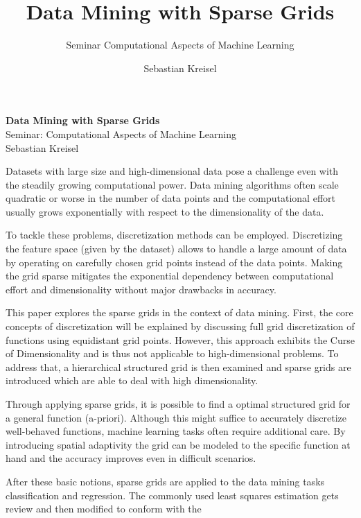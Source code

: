 \documentclass[a4paper]{scrartcl}
\title{Data Mining with Sparse Grids}
\subtitle{Seminar Computational Aspects of Machine Learning}
\author{Sebastian Kreisel}
\date{}
\begin{document}
\thispagestyle{empty}
\begin{center}
  \huge{\textbf{Data Mining with Sparse Grids}} \\
  \vspace{6px}
  \large{Seminar: Computational Aspects of Machine Learning} \\
  \vspace{15px}
  Sebastian Kreisel
\end{center}
\vspace{30px}
Datasets with large size and high-dimensional data pose a challenge even
with the steadily growing computational power.
Data mining algorithms often scale quadratic or worse in the number of
data points and the computational effort usually grows exponentially with
respect to the
dimensionality of the data.
\par
To tackle these problems, discretization methods can be employed.
Discretizing the feature space (given by the dataset)
allows to handle a large amount of data
by operating on carefully chosen grid points instead of the data points.
Making the grid sparse mitigates the exponential
dependency between computational effort and dimensionality without
major drawbacks in accuracy.
\par
This paper explores the sparse grids in the context of data mining.
First, the core concepts of discretization will be explained by
discussing full grid discretization of functions
using equidistant grid points. However,
this approach exhibits the Curse of Dimensionality and is thus not
applicable to high-dimensional problems. To address that, a hierarchical
structured grid is then examined and
sparse grids are introduced which are able to deal with high
dimensionality.
\par
Through applying sparse grids,
it is possible to find a optimal structured
grid for a general function (a-priori). Although this might suffice to
accurately discretize well-behaved functions, machine learning
tasks often require additional care. By introducing spatial adaptivity
the grid can be modeled to the specific function at hand and the accuracy
improves even in difficult scenarios.
\par
After these basic notions, sparse grids are
applied to the data mining tasks classification and regression.
The commonly used least squares
estimation gets review and then modified to conform with the
\end{document}

